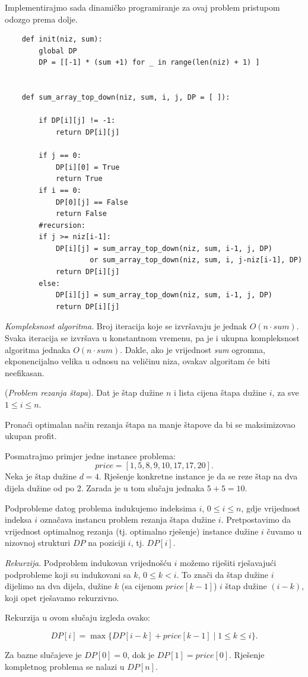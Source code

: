 Implementirajmo sada dinamičko programiranje za ovaj problem pristupom odozgo prema dolje.

   \begin{verbatim}
	def init(niz, sum):
		global DP
		DP = [[-1] * (sum +1) for _ in range(len(niz) + 1) ]
	
	
	def sum_array_top_down(niz, sum, i, j, DP = [ ]):
	
		if DP[i][j] != -1:
			return DP[i][j]
	
		if j == 0:
			DP[i][0] = True
			return True 
		if i == 0: 
			DP[0][j] == False
			return False
		#recursion: 
		if j >= niz[i-1]:
			DP[i][j] = sum_array_top_down(niz, sum, i-1, j, DP) 
	                or sum_array_top_down(niz, sum, i, j-niz[i-1], DP)
			return DP[i][j]
		else:
			DP[i][j] = sum_array_top_down(niz, sum, i-1, j, DP)
			return DP[i][j]
\end{verbatim}  

\textit{Kompleksnost algoritma}. Broj iteracija koje se izvršavaju je jednak $O(n \cdot sum)$. Svaka iteracija se izvršava u konstantnom vremenu, pa je i ukupna kompleksnost algoritma jednaka  $O(n \cdot sum)$. Dakle, ako je vrijednost \emph{sum} ogromna, ekponencijalno velika u odnosu na veličinu niza, ovakav algoritam će biti neefikasan. 



\begin{example}
	({\textit{Problem rezanja štapa}}). Dat je štap dužine $n$ i lista cijena štapa dužine $i$, za sve $1 \leq i \leq n$.
	
	Pronaći optimalan način rezanja  štapa na manje	štapove da bi se maksimi\-zovao ukupan profit.
\end{example}


\begin{solution}
	Posmatrajmo primjer jedne instance problema: 
	$$ price = [1, 5, 8, 9, 10,
	17, 17, 20].$$  Neka je štap dužine $d=4$.
	Rješenje konkretne instance je da se reze štap na dva dijela dužine od po 2. Zarada je u tom slučaju jednaka $5 + 5 = 10$.  \\ \vspace{0.2cm}
	
	 Podprobleme datog problema indukujemo indeksima $i$, $0 \leq i \leq n$, gdje vrijednost indeksa $i$ označava instancu problem rezanja štapa dužine $i$. Pretpo\-stavimo da vrijednost optimalnog rezanja (tj. optimalno rješenje)  instance dužine $i$ čuvamo u nizovnoj strukturi $DP$ na poziciji $i$, tj. $DP[i]$.
	 
	 \textit{Rekurzija}. Podproblem indukovan vrijednošću $i$ možemo  riješiti rješavajući podprobleme koji su indukovani sa $k$, $0 \leq k < i$. To znači da štap dužine $i$ dijelimo na dva dijela, dužine $k$ (sa cijenom $price[k-1]$) $i$ štap dužine $(i-k)$, koji opet rješavamo rekurzivno.  
	 
	 Rekurzija u ovom slučaju izgleda ovako:
	 
	 $$ DP[i] = \max \{ DP[i-k] + price[k-1] \mid 1 \leq k \leq i\}.$$
	 
	 Za bazne slučajeve je $DP[0] = 0$, dok je $DP[1] = price[0]$.
	 Rješenje kompletnog problema se nalazi u $DP[n]$.
\end{solution}

